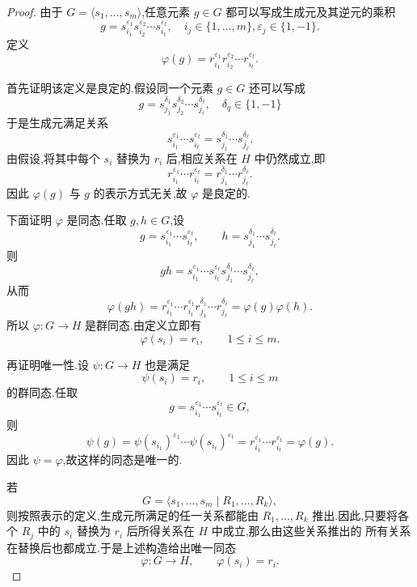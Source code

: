 \begin{proof}
	由于 $G=\langle s_1,\ldots,s_m\rangle$,任意元素 $g\in G$
	都可以写成生成元及其逆元的乘积
	\[
	g=s_{i_1}^{\varepsilon_1}s_{i_2}^{\varepsilon_2}
	\cdots s_{i_t}^{\varepsilon_t},	 
	\quad
	i_j\in\{1,\ldots,m\},
	\varepsilon_j\in\{1,-1\}.
	\] 
	定义
	\[
	\varphi(g)
	=
	r_{i_1}^{\varepsilon_1}r_{i_2}^{\varepsilon_2}
	\cdots r_{i_t}^{\varepsilon_t}.
	\]
	
	首先证明该定义是良定的.假设同一个元素 $g\in G$ 还可以写成
	\[
	g=s_{j_1}^{\delta_1}s_{j_2}^{\delta_2}
	\cdots s_{j_\ell}^{\delta_\ell},\quad\delta_q\in\{1,-1\}
	\]
	于是生成元满足关系
	\[
	s_{i_1}^{\varepsilon_1}\cdots s_{i_t}^{\varepsilon_t}
	=
	s_{j_1}^{\delta_1}\cdots s_{j_\ell}^{\delta_\ell}.
	\]
	由假设,将其中每个 $s_i$ 替换为 $r_i$ 后,相应关系在 $H$
	中仍然成立,即
	\[
	r_{i_1}^{\varepsilon_1}\cdots r_{i_t}^{\varepsilon_t}
	=
	r_{j_1}^{\delta_1}\cdots r_{j_\ell}^{\delta_\ell}.
	\]
	因此 $\varphi(g)$ 与 $g$ 的表示方式无关,故 $\varphi$ 是良定的.
	
	下面证明 $\varphi$ 是同态.任取 $g,h\in G$,设
	\[
	g=s_{i_1}^{\varepsilon_1}\cdots s_{i_t}^{\varepsilon_t},
	\qquad
	h=s_{j_1}^{\delta_1}\cdots s_{j_\ell}^{\delta_\ell}.
	\]
	则
	\[
	gh=
	s_{i_1}^{\varepsilon_1}\cdots s_{i_t}^{\varepsilon_t}
	s_{j_1}^{\delta_1}\cdots s_{j_\ell}^{\delta_\ell},
	\]
	从而\[ 	\varphi(gh)=
		r_{i_1}^{\varepsilon_1}\cdots r_{i_t}^{\varepsilon_t}
		r_{j_1}^{\delta_1}\cdots r_{j_\ell}^{\delta_\ell}=\varphi(g)\varphi(h). \]
	所以 $\varphi:G\to H$ 是群同态.由定义立即有
	\[
	\varphi(s_i)=r_i,
	\qquad 1\leq i\leq m.
	\]
	
	再证明唯一性.设 $\psi:G\to H$ 也是满足
	\[
	\psi(s_i)=r_i,
	\qquad 1\leq i\leq m
	\]
	的群同态.任取
	\[
	g=s_{i_1}^{\varepsilon_1}\cdots s_{i_t}^{\varepsilon_t}\in G,
	\]
	则\[ \psi(g)
		=
		\psi(s_{i_1})^{\varepsilon_1}\cdots
		\psi(s_{i_t})^{\varepsilon_t}=
		r_{i_1}^{\varepsilon_1}\cdots
		r_{i_t}^{\varepsilon_t}=\varphi(g).
 \]
	因此 $\psi=\varphi$,故这样的同态是唯一的.
	
	若
	\[
	G=\langle s_1,\ldots,s_m\mid R_1,\ldots,R_k\rangle,
	\]
	则按照表示的定义,生成元所满足的任一关系都能由
	$R_1,\ldots,R_k$ 推出.因此,只要将各个 $R_j$ 中的 $s_i$
	替换为 $r_i$ 后所得关系在 $H$ 中成立,那么由这些关系推出的
	所有关系在替换后也都成立.于是上述构造给出唯一同态
	\[
	\varphi:G\to H,
	\qquad
	\varphi(s_i)=r_i.
	\]
	

\end{proof}

